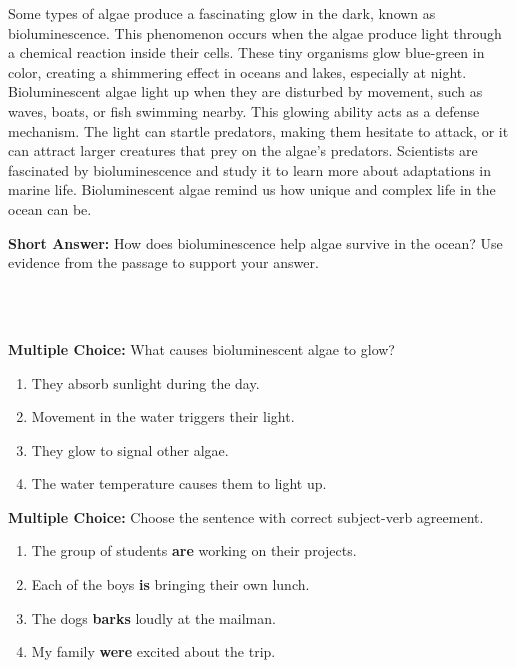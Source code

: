 \documentclass[12pt]{article}
\begin{document}
\begin{tcolorbox}[colframe=black!50, colback=white, title=Passage: Glow-in-the-Dark Algae]
Some types of algae produce a fascinating glow in the dark, known as bioluminescence. This phenomenon occurs when the algae produce light through a chemical reaction inside their cells. These tiny organisms glow blue-green in color, creating a shimmering effect in oceans and lakes, especially at night. Bioluminescent algae light up when they are disturbed by movement, such as waves, boats, or fish swimming nearby. This glowing ability acts as a defense mechanism. The light can startle predators, making them hesitate to attack, or it can attract larger creatures that prey on the algae’s predators. Scientists are fascinated by bioluminescence and study it to learn more about adaptations in marine life. Bioluminescent algae remind us how unique and complex life in the ocean can be.
\end{tcolorbox}

\begin{tcolorbox}[colframe=black!50, colback=white, title=Question 6]
\textbf{Short Answer:} How does bioluminescence help algae survive in the ocean? Use evidence from the passage to support your answer.  

\vspace{2em}
\\[0.8cm] \underline{\hspace{15.8cm}}  
    \\[0.8cm] \underline{\hspace{15.8cm}}  
\end{tcolorbox}

\begin{tcolorbox}[colframe=black!50, colback=white, title=Question 7]
\textbf{Multiple Choice:} What causes bioluminescent algae to glow?  
\begin{enumerate}[label=(\Alph*)]
\item They absorb sunlight during the day.  
\item Movement in the water triggers their light.  
\item They glow to signal other algae.  
\item The water temperature causes them to light up.  
\end{enumerate}
\end{tcolorbox}



\begin{tcolorbox}[colframe=black!50, colback=white, title=Question 8]
\textbf{Multiple Choice:} Choose the sentence with correct subject-verb agreement.  
\begin{enumerate}[label=(\Alph*)]
\item The group of students \textbf{are} working on their projects.  
\item Each of the boys \textbf{is} bringing their own lunch.  
\item The dogs \textbf{barks} loudly at the mailman.  
\item My family \textbf{were} excited about the trip.  
\end{enumerate}
\end{tcolorbox}
\end{document}
